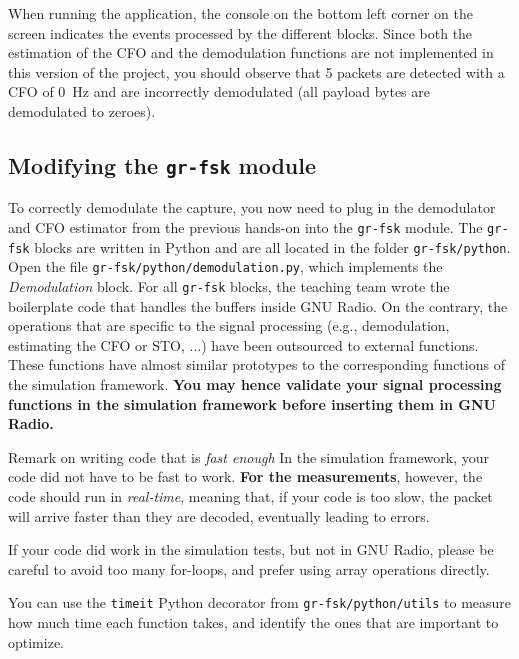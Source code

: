 When running the application, the console on the bottom left corner on the screen indicates the events processed by the different blocks.
Since both the estimation of the CFO and the demodulation functions are not implemented in this version of the project,
you should observe that 5 packets are detected with a CFO of \SI{0}{\hertz} and are incorrectly demodulated (all payload bytes are demodulated to zeroes).

\subsection{Modifying the \texttt{gr-fsk} module}

To correctly demodulate the capture, you now need to plug in the demodulator and CFO estimator from the previous hands-on into the \texttt{gr-fsk} module.
The \texttt{gr-fsk} blocks are written in Python and are all located in the folder \texttt{gr-fsk/python}.
Open the file \texttt{gr-fsk/python/demodulation.py}, which implements the \textit{Demodulation} block. For all \texttt{gr-fsk} blocks, the teaching team wrote the boilerplate code that
handles the buffers inside GNU Radio. On the contrary, the operations that are specific to the signal processing (e.g., demodulation, estimating the CFO or STO, ...) have been outsourced
to external functions. These functions have almost similar prototypes to the corresponding functions of the simulation framework.
\textbf{You may hence validate your signal processing functions in the simulation framework before inserting them in GNU Radio.}

\begin{bclogo}[couleur = gray!20, arrondi = 0.2, logo=\bcinfo]{Remark on writing code that is \textit{fast enough}}
    In the simulation framework, your code did not have to be fast to work.
    \textbf{For the measurements}, however, the code should run in \textit{real-time},
    meaning that, if your code is too slow, the packet will arrive faster
    than they are decoded, eventually leading to errors.

    If your code did work in the simulation tests, but not in GNU Radio, please
    be careful to avoid too many for-loops, and prefer using array operations
    directly.

    You can use the \texttt{timeit} Python decorator from
    \texttt{gr-fsk/python/utils} to measure how much time each function takes,
    and identify the ones that are important to optimize.
\end{bclogo}


